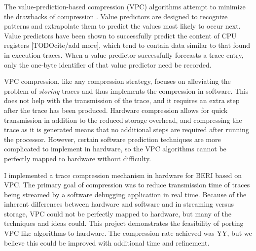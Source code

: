 \documentclass[conference]{IEEEtran}
\begin{document}
The value-prediction-based compression (VPC) algorithms attempt to minimize the drawbacks of compression \cite{vpc}. Value predictors are designed to recognize patterns and extrapolate them to predict the values most likely to occur next. Value predictors have been shown to successfully predict the content of CPU registers [TODOcite/add more], which tend to contain data similar to that found in execution traces. When a value predictor successfully forecasts a trace entry, only the one-byte identifier of that value predictor need be recorded. 

VPC compression, like any compression strategy, focuses on alleviating the problem of \emph{storing} traces and thus implements the compression in software. This does not help with the transmission of the trace, and it requires an extra step after the trace has been produced. Hardware compression allows for quick transmission in addition to the reduced storage overhead, and compressing the trace as it is generated means that no additional steps are required after running the processor. However, certain software prediction techniques are more complicated to implement in hardware, so the VPC algorithms cannot be perfectly mapped to hardware without difficulty.

I implemented a trace compression mechanism in hardware for BERI based on VPC. The primary goal of compression was to reduce transmission time of traces being streamed by a software debugging application in real time. Because of the inherent differences between hardware and software and in streaming versus storage, VPC could not be perfectly mapped to hardware, but many of the techniques and ideas could. This project demonstrates the feasibility of porting VPC-like algorithms to hardware. The compression rate achieved was YY, but we believe this could be improved with additional time and refinement. %

\end{document}
